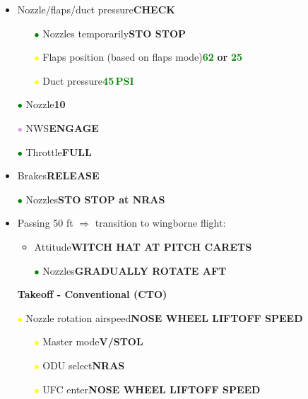 \documentclass[a4paper,12pt,dvipsnames]{letter}
\newcommand{\button}[1]{\textbf{#1}}
\newcommand{\Deg}{\textdegree{}}
\newcommand{\ok}[1]{\textcolor{Green}{\textbf{#1}}}
\newcommand{\gi}{\textcolor{Green}{$\bullet$\;}}
\newcommand{\yi}{\textcolor{Yellow}{$\bullet$\;}}
\newcommand{\vi}{\textcolor{Plum}{$\bullet$\;}}
\begin{document}
{\begin{itemize}
\item Nozzle/flaps/duct pressure\dotfill\button{CHECK}
\begin{itemize}
 \item[\gi] Nozzles temporarily\dotfill\button{STO STOP}
 \item[\yi] Flaps position (based on flaps mode)\dotfill\ok{62\Deg} \button{or} \ok{25\Deg}
 \item[\yi] Duct pressure\dotfill\ok{45\,PSI}
\end{itemize}
\item[\gi] Nozzle\dotfill\button{10\Deg}
\item[\vi] NWS\dotfill\button{ENGAGE}
\item[\gi] Throttle\dotfill\button{FULL}
\item Brakes\dotfill\button{RELEASE}
\item[\gi] Nozzles\dotfill\button{STO STOP at NRAS}
\item Passing 50 ft $\Rightarrow$ transition to wingborne flight:
\begin{itemize}
\item Attitude\dotfill\button{WITCH HAT AT PITCH CARETS}
\item[\gi] Nozzles\dotfill\button{GRADUALLY ROTATE AFT}
\end{itemize}
\end{itemize}
\newpage
\begin{itemize}
\item[] {\LARGE\textbf{Takeoff - Conventional (CTO)}}
\item[\yi] Nozzle rotation airspeed\dotfill\button{NOSE WHEEL LIFTOFF SPEED}
\begin{itemize}
 \item[\yi] Master mode\dotfill\button{V/STOL}
 \item[\yi] ODU select\dotfill\button{NRAS}
 \item[\yi] UFC enter\dotfill\button{NOSE WHEEL LIFTOFF SPEED}
\end{itemize}

\end{itemize}}
\end{document}
